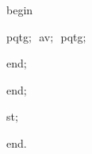{\vspace{\neglskip}\mbox{\blc  \blk\blk\blk\blk\idt  \mcl begin\idt }\par 
\vspace{\neglskip}\mbox{\blc  \blk\blk\blk\blk\blk\idt  pqtg$;$\ av$;$\ pqtg$;$\ }\par 
\vspace{\neglskip}\mbox{\blc  \blk\blk\blk\blk\idt  \mcl end\idt $;$}\par 
\vspace{\neglskip}\mbox{\blc  \blk\blk\idt  \mcl end\idt $;$}\par 
\vspace{\neglskip}\mbox{\blc  \blk\idt  st$;$\ }\par 
\vspace{\neglskip}\mbox{\blc  \idt  \mcl end\idt $.$}\par 

\medskip }

